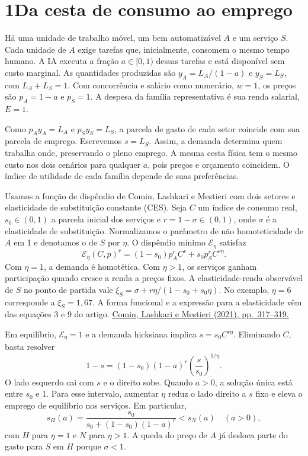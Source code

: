 \documentclass[11pt,a4paper]{article}
\newcommand{\titulo}[1]{\section*{\color{tinta}#1}}
\newcommand{\subtitulo}[1]{\par\smallskip{\large\bfseries\color{azul}#1\par}\nobreak}
\begin{document}
\newpage
\titulo{1\quad Da cesta de consumo ao emprego}
Há uma unidade de trabalho móvel, um bem automatizável \(A\) e um serviço \(S\). Cada unidade de \(A\) exige tarefas que, inicialmente, consomem o mesmo tempo humano. A IA executa a fração \(a\in[0,1)\) dessas tarefas e está disponível sem custo marginal. As quantidades produzidas são \(y_A=L_A/(1-a)\) e \(y_S=L_S\), com \(L_A+L_S=1\). Com concorrência e salário como numerário, \(w=1\), os preços são \(p_A=1-a\) e \(p_S=1\). A despesa da família representativa é sua renda salarial, \(E=1\).

Como \(p_Ay_A=L_A\) e \(p_Sy_S=L_S\), a parcela de gasto de cada setor coincide com sua parcela de emprego. Escrevemos \(s=L_S\). Assim, a demanda determina quem trabalha onde, preservando o pleno emprego. A mesma cesta física tem o mesmo custo nos dois cenários para qualquer \(a\), pois preços e orçamento coincidem. O índice de utilidade de cada família depende de suas preferências.

\subtitulo{O contrafactual da demanda}
Usamos a função de dispêndio de Comin, Lashkari e Mestieri com dois setores e elasticidade de substituição constante (CES). Seja \(C\) um índice de consumo real, \(s_0\in(0,1)\) a parcela inicial dos serviços e \(r=1-\sigma\in(0,1)\), onde \(\sigma\) é a elasticidade de substituição. Normalizamos o parâmetro de não homoteticidade de \(A\) em 1 e denotamos o de \(S\) por \(\eta\). O dispêndio mínimo \(\mathcal E_\eta\) satisfaz
\begin{equation}
  \mathcal E_\eta(C,p)^r=(1-s_0)p_A^r C^r+s_0p_S^r C^{r\eta}.
\end{equation}
Com \(\eta=1\), a demanda é homotética. Com \(\eta>1\), os serviços ganham participação quando cresce a renda a preços fixos. A elasticidade-renda observável de \(S\) no ponto de partida vale \(\xi_S=\sigma+r\eta/(1-s_0+s_0\eta)\). No exemplo, \(\eta=6\) corresponde a \(\xi_S=1{,}67\). A forma funcional e a expressão para a elasticidade vêm das equações 3 e 9 do artigo. \href{https://dcomin.host.dartmouth.edu/Publications_files/ECTA16317.pdf}{Comin, Lashkari e Mestieri (2021), pp.~317--319.}

Em equilíbrio, \(\mathcal E_\eta=1\) e a demanda hicksiana implica \(s=s_0 C^{r\eta}\). Eliminando \(C\), basta resolver
\begin{equation}
  1-s=(1-s_0)(1-a)^r\left(\frac{s}{s_0}\right)^{1/\eta}. \label{eq:share}
\end{equation}
O lado esquerdo cai com \(s\) e o direito sobe. Quando \(a>0\), a solução única está entre \(s_0\) e 1. Para esse intervalo, aumentar \(\eta\) reduz o lado direito a \(s\) fixo e eleva o emprego de equilíbrio nos serviços. Em particular,
\[
 s_H(a)=\frac{s_0}{s_0+(1-s_0)(1-a)^r}<s_N(a) \quad(a>0),
\]
com \(H\) para \(\eta=1\) e \(N\) para \(\eta>1\). A queda do preço de \(A\) já desloca parte do gasto para \(S\) em \(H\) porque \(\sigma<1\).
\end{document}
